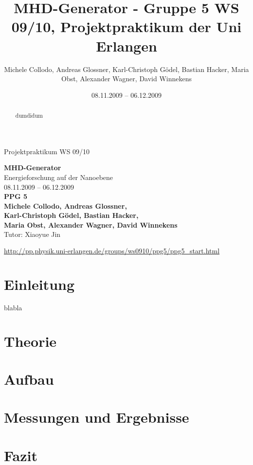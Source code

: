 \documentclass[11pt]{scrartcl}
\title{MHD-Generator - Gruppe 5 WS 09/10, Projektpraktikum der Uni Erlangen}
\date{08.11.2009 -- 06.12.2009}
\author{Michele Collodo, Andreas Glossner, Karl-Christoph G\"odel, Bastian Hacker, Maria Obst, Alexander Wagner, David Winnekens}
\begin{document}
\sloppy %
\thispagestyle{empty}
\large{Projektpraktikum WS 09/10}
\hfill
{}
\\[8\baselineskip]
\begin{center}
{\Huge\textbf{MHD-Generator}}
\\[0.5\baselineskip]
{\large Energieforschung auf der Nanoebene}
\\[1.5\baselineskip]
{\Large 08.11.2009 -- 06.12.2009}
\\[6\baselineskip]
{\huge\textbf{PPG 5}}\\[0.5\baselineskip]
{\large\textbf{
Michele Collodo,
Andreas Glossner,\\
Karl-Christoph G\"odel,
Bastian Hacker,\\
Maria Obst,
Alexander Wagner,
David Winnekens}\\
Tutor: Xiaoyue Jin}
\vfill



\small{\url{http://pp.physik.uni-erlangen.de/groups/ws0910/ppg5/ppg5\_start.html}}
\end{center}
\newpage



\tableofcontents
\vfill



\begin{abstract}
dumdidum
\end{abstract}
\newpage

\section{Einleitung}
blabla

\section{Theorie}

\section{Aufbau}

\section{Messungen und Ergebnisse}

\section{Fazit}
\end{document}
